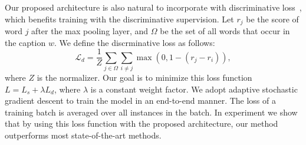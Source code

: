 \documentclass[10pt,twocolumn,letterpaper]{article}
\begin{document}
	Our proposed architecture is also natural to incorporate with discriminative loss~\cite{fang2015captions}, which benefits training with the discriminative supervision. Let $r_j$ be the score of word $j$ after the max pooling layer, and $\Omega$ be the set of all words that occur in the caption $w$.  We define the discrminative loss as follows:
	\begin{equation}{\mathcal{L}_d} = \frac{1}{Z}\sum\limits_{j \in \Omega} {\sum\limits_{i \ne j} {\max (0,1 - ({r_j} - {r_i}))} },
	\end{equation}
	where $Z$ is the normalizer. Our goal is to minimize this loss function $L= L_s + \lambda L_d$, where $\lambda$ is a constant weight factor.
	We adopt adaptive stochastic gradient descent to train the model in an end-to-end manner. The loss of a training batch is averaged over all instances in the batch. In experiment we show that by using this loss function with the proposed architecture, our method outperforms most state-of-the-art methods.
	
\end{document}
